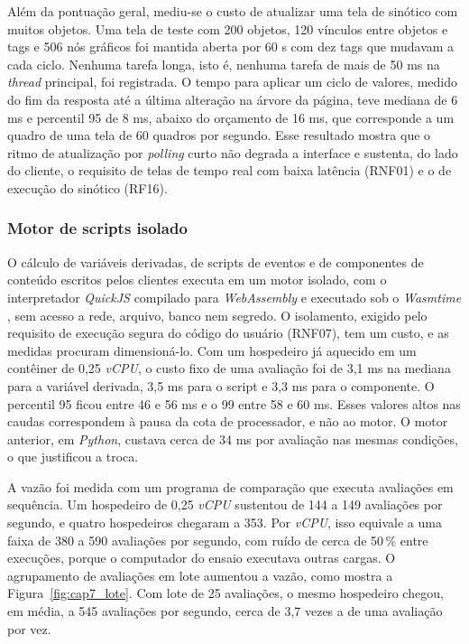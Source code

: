 \par Além da pontuação geral, mediu-se o custo de atualizar uma tela de sinótico com muitos objetos. Uma tela de teste com 200 objetos, 120 vínculos entre objetos e tags e 506 nós gráficos foi mantida aberta por 60 s com dez tags que mudavam a cada ciclo. Nenhuma tarefa longa, isto é, nenhuma tarefa de mais de 50 ms na \emph{thread} principal, foi registrada. O tempo para aplicar um ciclo de valores, medido do fim da resposta até a última alteração na árvore da página, teve mediana de 6 ms e percentil 95 de 8 ms, abaixo do orçamento de 16 ms, que corresponde a um quadro de uma tela de 60 quadros por segundo. Esse resultado mostra que o ritmo de atualização por \emph{polling} curto não degrada a interface e sustenta, do lado do cliente, o requisito de telas de tempo real com baixa latência (RNF01) e o de execução do sinótico (RF16).

\subsubsection{Motor de scripts isolado}

\par O cálculo de variáveis derivadas, de scripts de eventos e de componentes de conteúdo escritos pelos clientes executa em um motor isolado, com o interpretador \emph{QuickJS} \cite{QUICKJS_DOCS} compilado para \emph{WebAssembly} \cite{WEBASSEMBLY_SPEC} e executado sob o \emph{Wasmtime} \cite{WASMTIME_DOCS}, sem acesso a rede, arquivo, banco nem segredo. O isolamento, exigido pelo requisito de execução segura do código do usuário (RNF07), tem um custo, e as medidas procuram dimensioná-lo. Com um hospedeiro já aquecido em um contêiner de 0,25 \emph{vCPU}, o custo fixo de uma avaliação foi de 3,1 ms na mediana para a variável derivada, 3,5 ms para o script e 3,3 ms para o componente. O percentil 95 ficou entre 46 e 56 ms e o 99 entre 58 e 60 ms. Esses valores altos nas caudas correspondem à pausa da cota de processador, e não ao motor. O motor anterior, em \emph{Python}, custava cerca de 34 ms por avaliação nas mesmas condições, o que justificou a troca.

\par A vazão foi medida com um programa de comparação que executa avaliações em sequência. Um hospedeiro de 0,25 \emph{vCPU} sustentou de 144 a 149 avaliações por segundo, e quatro hospedeiros chegaram a 353. Por \emph{vCPU}, isso equivale a uma faixa de 380 a 590 avaliações por segundo, com ruído de cerca de 50\,\% entre execuções, porque o computador do ensaio executava outras cargas. O agrupamento de avaliações em lote aumentou a vazão, como mostra a Figura~\ref{fig:cap7_lote}. Com lote de 25 avaliações, o mesmo hospedeiro chegou, em média, a 545 avaliações por segundo, cerca de 3,7 vezes a de uma avaliação por vez.


